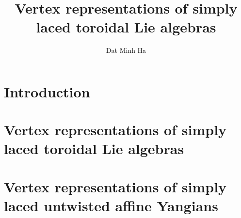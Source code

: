 

\setcounter{section}{-1}


\newcommand{\simpleroots}{\mathbb{I}}
\newcommand{\toroidal}{\t}
\newcommand{\Yangian}{\rmY}
\newcommand{\YangianDouble}{\rmD\rmY}
\newcommand{\extendedYangianDouble}{\widetilde{\rmD\rmY}}



    \title{Vertex representations of simply laced toroidal Lie algebras}
    
    \author{Dat Minh Ha}
    \maketitle
    
    \begin{abstract}
        
    \end{abstract}
    
    {
    \hypersetup{} 
    \tableofcontents %
    }

    \section{Introduction}

    \section{Vertex representations of simply laced toroidal Lie algebras}

    \section{Vertex representations of simply laced untwisted affine Yangians}
    
    \printbibliography

